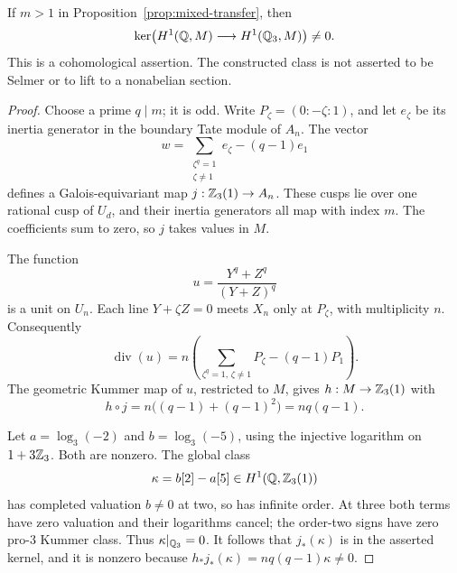 \begin{proposition}
\label{prop:mixed-kernel}
If $m>1$ in Proposition~\ref{prop:mixed-transfer}, then
\[
\ker\bigl(H^1(\mathbb Q,M)\longrightarrow H^1(\mathbb Q_3,M)\bigr)\ne0.
\]
This is a cohomological assertion. The constructed class is not
asserted to be Selmer or to lift to a nonabelian section.
\end{proposition}
\begin{proof}
Choose a prime $q\mid m$; it is odd. Write
$P_\zeta=(0:-\zeta:1)$, and let $e_\zeta$ be its inertia
generator in the boundary Tate module of $A_n$. The vector
\[
w=\sum_{\substack{\zeta^q=1\\\zeta\ne1}}e_\zeta-(q-1)e_1
\]
defines a Galois-equivariant map $j:\mathbb Z_3(1)\to A_n$.
These cusps lie over one rational cusp of $U_d$, and their
inertia generators all map with index $m$. The coefficients
sum to zero, so $j$ takes values in $M$.

The function
\[
u=\frac{Y^q+Z^q}{(Y+Z)^q}
\]
is a unit on $U_n$. Each line $Y+\zeta Z=0$ meets $X_n$
only at $P_\zeta$, with multiplicity $n$. Consequently
\[
\operatorname{div}(u)=n\left(
\sum_{\zeta^q=1,\,\zeta\ne1}P_\zeta-(q-1)P_1\right).
\]
The geometric Kummer map of $u$, restricted to $M$, gives
$h:M\to\mathbb Z_3(1)$ with
\[
h\circ j=n\bigl((q-1)+(q-1)^2\bigr)=nq(q-1).
\]

Let $a=\log_3(-2)$ and $b=\log_3(-5)$, using the injective
logarithm on $1+3\mathbb Z_3$. Both are nonzero. The global class
\[
\kappa=b[2]-a[5]\in H^1(\mathbb Q,\mathbb Z_3(1))
\]
has completed valuation $b\ne0$ at two, so has infinite order.
At three both terms have zero valuation and their logarithms
cancel; the order-two signs have zero pro-$3$ Kummer class.
Thus $\kappa|_{\mathbb Q_3}=0$. It follows that $j_*(\kappa)$ is in
the asserted kernel, and it is nonzero because
$h_*j_*(\kappa)=nq(q-1)\kappa\ne0$.
\end{proof}
